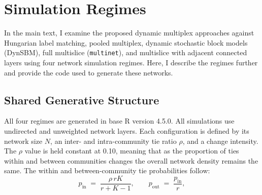 \documentclass[11pt, letterpaper]{article}
\renewcommand{\theequation}{\thesection.\arabic{equation}}
\numberwithin{equation}{section}
\begin{document}
\appendix
\renewcommand{\thesection}{A\arabic{section}}
\renewcommand{\thetable}{A\arabic{table}}
\renewcommand{\thefigure}{A\arabic{figure}}
\renewcommand{\theequation}{A\arabic{equation}}
\setcounter{section}{0}\setcounter{table}{0}
\setcounter{figure}{0}\setcounter{equation}{0}

\doublespacing
\setcounter{page}{1}
\renewcommand{\contentsname}{Table of Contents}
\vspace{-10pt}
\begin{singlespace}
\tableofcontents
\end{singlespace}\vspace{-10pt}

\newpage
\section{Simulation Regimes}
In the main text, I examine the proposed dynamic multiplex approaches against Hungarian label matching, pooled multiplex, dynamic stochastic block models (DynSBM), full multislice (\texttt{multinet}), and multislice with adjacent connected layers using four network simulation regimes. Here, I describe the regimes further and provide the code used to generate these networks. 

\subsection{Shared Generative Structure}
All four regimes are generated in base \textsf{R} version 4.5.0. All simulations use undirected and unweighted network layers. Each configuration is defined by its network size $N$, an inter- and intra-community tie ratio $\rho$, and a change intensity. The $\rho$ value is held constant at 0.10, meaning that as the proportion of ties within and between communities changes the overall network density remains the same. The within and between-community tie probabilities follow: \begin{equation}\label{eq:dens}
p_{\text{in}} \;=\; \frac{\rho\, r K}{r + K - 1},
\qquad
p_{\text{out}} \;=\; \frac{p_{\text{in}}}{r},
\end{equation}
\end{document}
